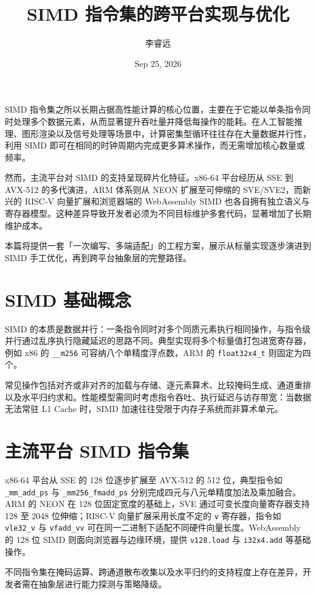 \title{SIMD 指令集的跨平台实现与优化}
\author{李睿远}
\date{Sep 25, 2026}
\maketitle
SIMD 指令集之所以长期占据高性能计算的核心位置，主要在于它能以单条指令同时处理多个数据元素，从而显著提升吞吐量并降低每操作的能耗。在人工智能推理、图形渲染以及信号处理等场景中，计算密集型循环往往存在大量数据并行性，利用 SIMD 即可在相同的时钟周期内完成更多算术操作，而无需增加核心数量或频率。\par
然而，主流平台对 SIMD 的支持呈现碎片化特征。x86-64 平台经历从 SSE 到 AVX-512 的多代演进，ARM 体系则从 NEON 扩展至可伸缩的 SVE/SVE2，而新兴的 RISC-V 向量扩展和浏览器端的 WebAssembly SIMD 也各自拥有独立语义与寄存器模型。这种差异导致开发者必须为不同目标维护多套代码，显著增加了长期维护成本。\par
本篇将提供一套「一次编写、多端适配」的工程方案，展示从标量实现逐步演进到 SIMD 手工优化，再到跨平台抽象层的完整路径。\par
\chapter{SIMD 基础概念}
SIMD 的本质是数据并行：一条指令同时对多个同质元素执行相同操作，与指令级并行通过乱序执行隐藏延迟的思路不同。典型实现将多个标量值打包进宽寄存器，例如 x86 的 \texttt{\_{}\_{}m256} 可容纳八个单精度浮点数，ARM 的 \texttt{float32x4\_{}t} 则固定为四个。\par
常见操作包括对齐或非对齐的加载与存储、逐元素算术、比较掩码生成、通道重排以及水平归约求和。性能模型需同时考虑指令吞吐、执行延迟与访存带宽：当数据无法常驻 L1 Cache 时，SIMD 加速往往受限于内存子系统而非算术单元。\par
\chapter{主流平台 SIMD 指令集}
x86-64 平台从 SSE 的 128 位逐步扩展至 AVX-512 的 512 位，典型指令如 \texttt{\_{}mm\_{}add\_{}ps} 与 \texttt{\_{}mm256\_{}fmadd\_{}ps} 分别完成四元与八元单精度加法及乘加融合。ARM 的 NEON 在 128 位固定宽度的基础上，SVE 通过可变长度向量寄存器支持 128 至 2048 位伸缩；RISC-V 向量扩展采用长度不定的 \texttt{v} 寄存器，指令如 \texttt{vle32\_{}v} 与 \texttt{vfadd\_{}vv} 可在同一二进制下适配不同硬件向量长度。WebAssembly 的 128 位 SIMD 则面向浏览器与边缘环境，提供 \texttt{v128.load} 与 \texttt{i32x4.add} 等基础操作。\par
不同指令集在掩码运算、跨通道散布收集以及水平归约的支持程度上存在差异，开发者需在抽象层进行能力探测与策略降级。\par

